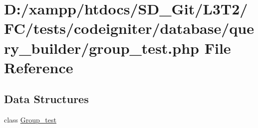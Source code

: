 \hypertarget{tests_2codeigniter_2database_2query__builder_2group__test_8php}{}\section{D\+:/xampp/htdocs/\+S\+D\+\_\+\+Git/\+L3\+T2/\+F\+C/tests/codeigniter/database/query\+\_\+builder/group\+\_\+test.php File Reference}
\label{tests_2codeigniter_2database_2query__builder_2group__test_8php}
\subsection*{Data Structures}
\begin{DoxyCompactItemize}
\item 
class \hyperlink{class_group__test}{Group\+\_\+test}
\end{DoxyCompactItemize}
